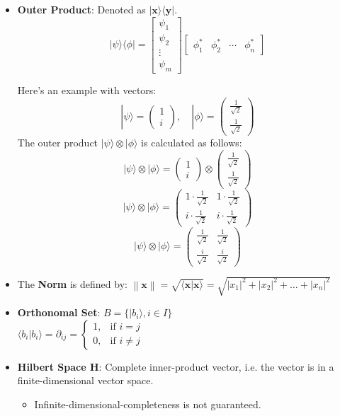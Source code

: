 \documentclass{report}
\begin{document}
\begin{itemize}
\item \textbf{Outer Product}: Denoted as \(|\mathbf{x} \rangle \langle \mathbf{y}| \).
\[ |\psi\rangle \langle \phi| = \begin{bmatrix}
\psi_1 \\ \psi_2 \\ \vdots \\ \psi_m
\end{bmatrix} \begin{bmatrix}
\phi_1^* & \phi_2^* & \cdots & \phi_n^*
\end{bmatrix} \]

    Here's an example with vectors:
    \[
    |\psi\rangle = \begin{pmatrix} 1 \\ i \end{pmatrix}, \quad |\phi\rangle = \begin{pmatrix} \frac{1}{\sqrt{2}} \\ \frac{1}{\sqrt{2}} \end{pmatrix}
    \]
    The outer product \(|\psi\rangle \otimes |\phi\rangle\) is calculated as follows:
    \[
    |\psi\rangle \otimes |\phi\rangle = \begin{pmatrix} 1 \\ i \end{pmatrix} \otimes \begin{pmatrix} \frac{1}{\sqrt{2}} \\ \frac{1}{\sqrt{2}} \end{pmatrix}
    \]
    \[
    |\psi\rangle \otimes |\phi\rangle = \begin{pmatrix} 1 \cdot \frac{1}{\sqrt{2}} & 1 \cdot \frac{1}{\sqrt{2}} \\ i \cdot \frac{1}{\sqrt{2}} & i \cdot \frac{1}{\sqrt{2}} \end{pmatrix}
    \]
    \[
    |\psi\rangle \otimes |\phi\rangle = \begin{pmatrix} \frac{1}{\sqrt{2}} & \frac{1}{\sqrt{2}} \\ \frac{i}{\sqrt{2}} & \frac{i}{\sqrt{2}} \end{pmatrix}
    \]
    \item The \textbf{Norm} is defined by: $\left\| \mathbf{x} \right\| = \sqrt{\langle \mathbf{x} | \mathbf{x} \rangle} = \sqrt{|x_1|^2 + |x_2|^2 + \dots + |x_n|^2}$
    \item \textbf{Orthonomal Set}: $B = \{|b_i \rangle, i \in I\}$ \\
    $\langle b_i | b_i \rangle = \partial_{ij} =
\begin{cases}
1, & \text{if } i = j \\
0, & \text{if } i \neq j
\end{cases}
$
\item \textbf{Hilbert Space H}: Complete inner-product vector, i.e. the vector is in a finite-dimensional vector space.
\begin{itemize}
    \item Infinite-dimensional-completeness is not guaranteed.
\end{itemize}

\end{itemize}
\end{document}
